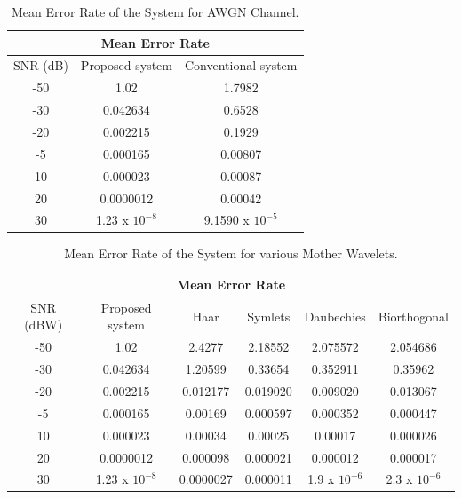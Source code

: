 \begin{table}[htpb]
    \centering
    \caption{Mean Error Rate of the System for AWGN Channel.}
    \begin{tabular}{|c|c|c|}
    \hline
    \multicolumn{3}{|c|}{Mean Error Rate} \\
    \hline
       SNR (dB)  & Proposed system & Conventional system \\
       \hline
        -50 & 1.02 & 1.7982 \\
         \hline
         -30 & 0.042634 & 0.6528\\
         \hline
         -20 & 0.002215 & 0.1929\\
         \hline
         -5 & 0.000165 & 0.00807\\ 
         \hline 
         10 & 0.000023 & 0.00087\\ 
         \hline
         20 & 0.0000012 & 0.00042\\
         \hline 
         30 & 1.23 x $10^{-8}$ & 9.1590 x $10^{-5}$\\
         \hline
    \end{tabular}
    \label{tab:error_awgn}
\end{table}

\begin{table}[htpb]
    \centering
    \begin{tabular}{|c|c|c|c|c|c|}
    \hline
    \multicolumn{6}{|c|}{Mean Error Rate} \\
    \hline
        SNR (dBW) & Proposed system & Haar & Symlets & Daubechies & Biorthogonal  \\
        \hline
         -50 & 1.02 & 2.4277 & 2.18552 & 2.075572 & 2.054686\\
        \hline
        -30 & 0.042634 & 1.20599 & 0.33654 & 0.352911 & 0.35962\\
        \hline
        -20 & 0.002215 & 0.012177 & 0.019020 & 0.009020 & 0.013067 \\
        \hline
         -5 & 0.000165 & 0.00169 & 0.000597 & 0.000352 & 0.000447\\
        \hline
         10 & 0.000023 & 0.00034 & 0.00025 & 0.00017 & 0.000026\\
        \hline
         20 & 0.0000012 & 0.000098 & 0.000021 & 0.000012 & 0.000017\\
        \hline
        30 & 1.23 x $10^{-8}$ & 0.0000027 & 0.000011 & 1.9 x $10^{-6}$ & 2.3 x $10^{-6}$ \\
        \hline
    \end{tabular}
    \caption{Mean Error Rate of the System for various Mother Wavelets.}
    \label{tab:error_awgn_wavelets}
\end{table}

